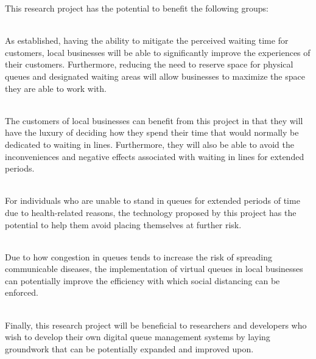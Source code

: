 This research project has the potential to benefit the following groups:

 \\
As established, having the ability to mitigate the perceived waiting time for customers, local businesses will be able to significantly improve the experiences of their customers. Furthermore, reducing the need to reserve space for physical queues and designated waiting areas will allow businesses to maximize the space they are able to work with.

 \\
The customers of local businesses can benefit from this project in that they will have the luxury of deciding how they spend their time that would normally be dedicated to waiting in lines. Furthermore, they will also be able to avoid the inconveniences and negative effects associated with waiting in lines for extended periods.

 \\
For individuals who are unable to stand in queues for extended periods of time due to health-related reasons, the technology proposed by this project has the potential to help them avoid placing themselves at further risk.

 \\
Due to how congestion in queues tends to increase the risk of spreading communicable diseases, the implementation of virtual queues in local businesses can potentially improve the efficiency with which social distancing can be enforced.

 \\
Finally, this research project will be beneficial to researchers and developers who wish to develop their own digital queue management systems by laying groundwork that can be potentially expanded and improved upon.
